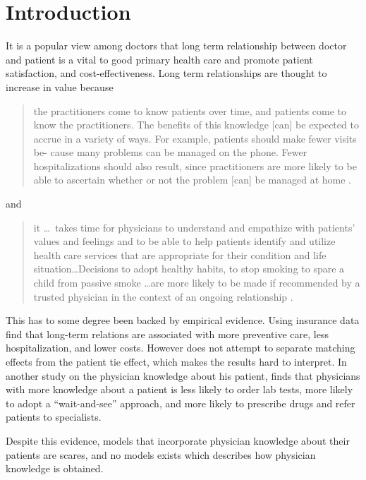 \section{Introduction}
It is a popular view among doctors that long term relationship between doctor and patient is a vital to good primary health care and promote patient satisfaction, and cost-effectiveness. Long term relationships are thought to increase in value because
\begin{quotation}
the practitioners come to know patients over time, and patients come to know the practitioners. The benefits of this knowledge [can] be expected to accrue in a variety of ways. For example, patients should make fewer visits be- cause many problems can be managed on the phone. Fewer hospitalizations should also result, since practitioners are more likely to be able to ascertain whether or not the problem [can] be managed at home \parencite[p. 41--42]{Starfield1993Primary}.
\end{quotation}
and
\begin{quotation}
it \ldots \ takes time for physicians to understand and empathize with patients' values and feelings and to be able to help patients identify and utilize health care services that are appropriate for their condition and life situation\ldots Decisions to adopt healthy habits, to stop smoking to spare a child from passive smoke \ldots are more likely to be made if recommended by a trusted physician in the context of an ongoing relationship \parencite[p. 324--235]{Emanuel1995Preserving}.
\end{quotation}
This has to some degree been backed by empirical evidence. Using insurance data \textcite{Weiss1996Faithful} find that long-term relations are associated with more preventive care, less hospitalization, and lower costs. However \citeauthor{Weiss1996Faithful} does not attempt to separate matching effects from the patient tie effect, which makes the results hard to interpret. In another study on the physician knowledge about his patient,   \textcite{Hjortdahl1991Continuity}  finds that physicians with more knowledge about a patient is less likely to order lab tests, more likely to adopt a ``wait-and-see'' approach, and more likely to prescribe drugs and refer patients to specialists.

Despite this evidence, models that incorporate physician knowledge about their patients are scares, and no models exists which describes how physician knowledge is obtained.

